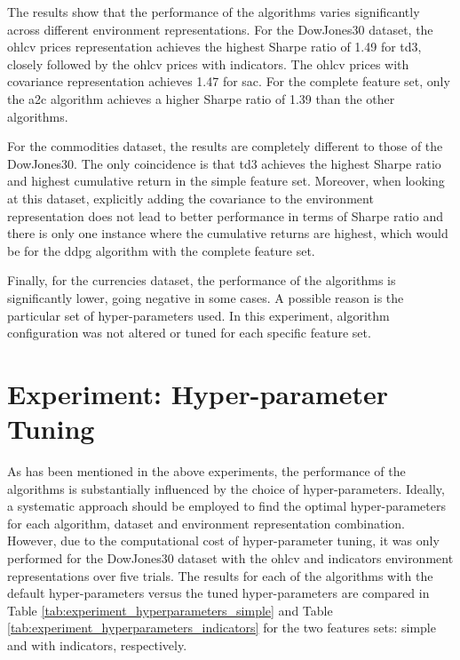 

The results show that the performance of the algorithms varies significantly across different environment representations. For the DowJones30 dataset, the \acrshort{ohlcv} prices representation achieves the highest Sharpe ratio of 1.49 for \acrshort{td3}, closely followed by the \acrshort{ohlcv} prices with indicators. The \acrshort{ohlcv} prices with covariance representation achieves 1.47 for \acrshort{sac}. For the complete feature set, only the \acrshort{a2c} algorithm achieves a higher Sharpe ratio of 1.39 than the other algorithms.

For the commodities dataset, the results are completely different to those of the DowJones30. The only coincidence is that \acrshort{td3} achieves the highest Sharpe ratio and highest cumulative return in the simple feature set. Moreover, when looking at this dataset, explicitly adding the covariance to the environment representation does not lead to better performance in terms of Sharpe ratio and there is only one instance where the cumulative returns are highest, which would be for the \acrshort{ddpg} algorithm with the complete feature set.

Finally, for the currencies dataset, the performance of the algorithms is significantly lower, going negative in some cases. A possible reason is the particular set of hyper-parameters used. In this experiment, algorithm configuration was not altered or tuned for each specific feature set.

\section{Experiment: Hyper-parameter Tuning} \label{sec:hyper-parameter-tuning}

As has been mentioned in the above experiments, the performance of the algorithms is substantially influenced by the choice of hyper-parameters. Ideally, a systematic approach should be employed to find the optimal hyper-parameters for each algorithm, dataset and environment representation combination. However, due to the computational cost of hyper-parameter tuning, it was only performed for the DowJones30 dataset with the \acrshort{ohlcv} and indicators environment representations over five trials. The results for each of the algorithms with the default hyper-parameters versus the tuned hyper-parameters are compared in Table \ref{tab:experiment_hyperparameters_simple} and Table \ref{tab:experiment_hyperparameters_indicators} for the two features sets: simple and with indicators, respectively.

